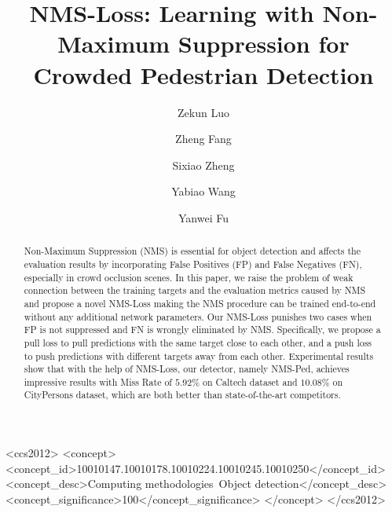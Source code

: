 \documentclass[sigconf]{acmart}
\begin{document}
\fancyhead{}

\title{NMS-Loss: Learning with Non-Maximum Suppression for Crowded Pedestrian Detection}

\author{Zekun Luo}

\author{Zheng Fang}

\author{Sixiao Zheng}

\author{Yabiao Wang}

\author{Yanwei Fu}

\begin{abstract}

Non-Maximum Suppression (NMS) is essential for object detection and affects the evaluation results by incorporating False Positives (FP) and False Negatives (FN), especially in crowd occlusion scenes. In this paper, we raise the problem of weak connection between the training targets and the evaluation metrics caused by NMS and propose a novel NMS-Loss making the NMS procedure can be trained end-to-end without any additional network parameters. Our NMS-Loss punishes two cases when FP is not suppressed and FN is wrongly eliminated by NMS. Specifically, we propose a pull loss to pull predictions with the same target close to each other, and a push loss to push predictions with different targets away from each other. Experimental results show that with the help of NMS-Loss, our detector, namely NMS-Ped, achieves impressive results with Miss Rate of $5.92\%$ on Caltech dataset and $10.08\%$ on CityPersons dataset, which are both better than state-of-the-art competitors.

\end{abstract}

\begin{CCSXML}
<ccs2012>
<concept>
<concept_id>10010147.10010178.10010224.10010245.10010250</concept_id>
<concept_desc>Computing methodologies~Object detection</concept_desc>
<concept_significance>100</concept_significance>
</concept>
</ccs2012>
\end{CCSXML}
\end{document}
